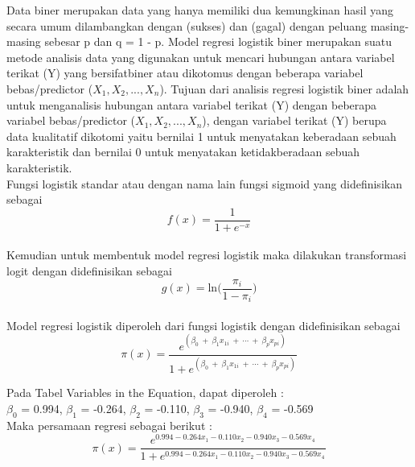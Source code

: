 \begin{sloppypar}
Data biner merupakan data yang hanya memiliki dua kemungkinan hasil yang secara umum dilambangkan dengan (sukses) dan (gagal) dengan peluang masing-masing sebesar p dan q = 1 - p. Model regresi logistik biner merupakan suatu metode analisis data yang digunakan untuk mencari hubungan antara variabel terikat (Y) yang bersifatbiner atau dikotomus dengan beberapa variabel bebas/predictor ($X_1, X_2, ..., X_n$).
Tujuan dari analisis regresi logistik biner adalah untuk menganalisis hubungan antara variabel terikat (Y) dengan beberapa variabel bebas/predictor ($X_1, X_2, ..., X_n$), dengan variabel terikat (Y) berupa data kualitatif dikotomi yaitu bernilai 1 untuk menyatakan keberadaan sebuah karakteristik dan bernilai 0 untuk menyatakan ketidakberadaan sebuah karakteristik.
\\ Fungsi logistik standar atau dengan nama lain fungsi sigmoid yang didefinisikan sebagai $$f(x) = \frac{1}{1 + e^{-x}}$$
\\ Kemudian untuk membentuk model regresi logistik maka dilakukan transformasi logit dengan didefinisikan sebagai $$g(x) = \text{ln}\Big( {\frac{\pi_i}{1 - \pi_i}} \Big)$$
\\ Model regresi logistik diperoleh dari fungsi logistik dengan didefinisikan sebagai $$\pi(x) = \frac{e^{(\beta_0\ +\ \beta_1 x_{1i}\ +\ \cdots\ +\ \beta_p x_{pi})}}{1 + e^{(\beta_0\ +\ \beta_1 x_{1i}\ +\ \cdots\ +\ \beta_p x_{pi})}}$$
\end{sloppypar}
\begin{test}{
    Pada Tabel Variables in the Equation, dapat diperoleh : \\
    $\beta_0$ = 0.994, $\beta_1$ = -0.264, $\beta_2$ = -0.110, $\beta_3$ = -0.940, $\beta_4$ = -0.569 \\
    Maka persamaan regresi sebagai berikut : \\
    \begin{equation*}
        \pi(x) = \frac{e^{0.994 - 0.264 x_1 - 0.110 x_2 - 0.940 x_3 - 0.569 x_4}}{1 + e^{0.994 - 0.264 x_1 - 0.110 x_2 - 0.940 x_3 - 0.569 x_4}}
    \end{equation*}
}
\end{test}

